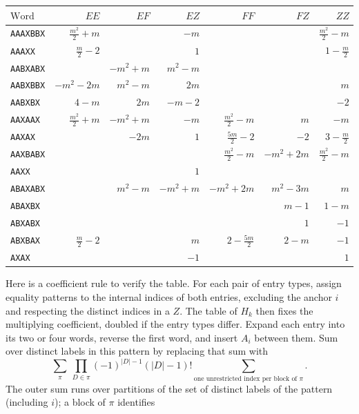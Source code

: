 \documentclass[11pt]{article}
\begin{document}
\begin{center}
\small\setlength{\tabcolsep}{4pt}
\begin{tabular}{@{}lrrrrrr@{}}
\(\text{Word}\)&\(EE\)&\(EF\)&\(EZ\)&\(FF\)&\(FZ\)&\(ZZ\)\\ \hline
\texttt{AAAXBBX} & $\frac{m^{2}}{2} + m$ &  & $- m$ &  &  & $\frac{m^{2}}{2} - m$ \\
\texttt{AAAXX} & $\frac{m}{2} - 2$ &  & $1$ &  &  & $1 - \frac{m}{2}$ \\
\texttt{AABXABX} &  & $- m^{2} + m$ & $m^{2} - m$ &  &  &  \\
\texttt{AABXBBX} & $- m^{2} - 2 m$ & $m^{2} - m$ & $2 m$ &  &  & $m$ \\
\texttt{AABXBX} & $4 - m$ & $2 m$ & $- m - 2$ &  &  & $-2$ \\
\texttt{AAXAAX} & $\frac{m^{2}}{2} + m$ & $- m^{2} + m$ & $- m$ & $\frac{m^{2}}{2} - m$ & $m$ & $- m$ \\
\texttt{AAXAX} &  & $- 2 m$ & $1$ & $\frac{5 m}{2} - 2$ & $-2$ & $3 - \frac{m}{2}$ \\
\texttt{AAXBABX} &  &  &  & $\frac{m^{2}}{2} - m$ & $- m^{2} + 2 m$ & $\frac{m^{2}}{2} - m$ \\
\texttt{AAXX} &  &  & $1$ &  &  &  \\
\texttt{ABAXABX} &  & $m^{2} - m$ & $- m^{2} + m$ & $- m^{2} + 2 m$ & $m^{2} - 3 m$ & $m$ \\
\texttt{ABAXBX} &  &  &  &  & $m - 1$ & $1 - m$ \\
\texttt{ABXABX} &  &  &  &  & $1$ & $-1$ \\
\texttt{ABXBAX} & $\frac{m}{2} - 2$ &  & $m$ & $2 - \frac{5 m}{2}$ & $2 - m$ & $-1$ \\
\texttt{AXAX} &  &  & $-1$ &  &  & $1$ \\
\end{tabular}
\end{center}
Here is a coefficient rule to verify the table. For each pair of
entry types, assign equality patterns to the internal indices
of both entries, excluding the anchor \(i\) and respecting the
distinct indices in a \(Z\). The table of \(H_k\) then fixes the
multiplying coefficient, doubled if the entry types differ.
Expand each entry into its two or four words, reverse the first
word, and insert \(A_i\) between them. Sum over distinct labels
in this pattern by replacing that sum with
\[
\sum_{\pi}\ \prod_{D\in\pi}(-1)^{|D|-1}(|D|-1)!
  \sum_{\text{one unrestricted index per block of }\pi}.
\]
The outer sum runs over partitions of the set of distinct labels
of the pattern (including \(i\)); a block of \(\pi\) identifies
\end{document}
